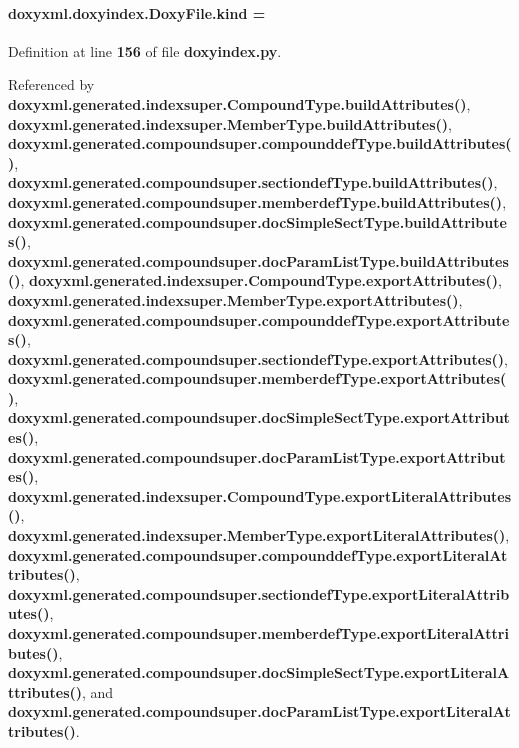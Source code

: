 \paragraph[{kind}]{ doxyxml.\+doxyindex.\+Doxy\+File.\+kind = \textquotesingle{}\hspace{0.3cm}{\ttfamily [static]}}\label{classdoxyxml_1_1doxyindex_1_1DoxyFile_a4be3dce59cc4b8322dfa2df5cbd0ef0d}


Definition at line {\bf 156} of file {\bf doxyindex.\+py}.



Referenced by {\bf doxyxml.\+generated.\+indexsuper.\+Compound\+Type.\+build\+Attributes()}, {\bf doxyxml.\+generated.\+indexsuper.\+Member\+Type.\+build\+Attributes()}, {\bf doxyxml.\+generated.\+compoundsuper.\+compounddef\+Type.\+build\+Attributes()}, {\bf doxyxml.\+generated.\+compoundsuper.\+sectiondef\+Type.\+build\+Attributes()}, {\bf doxyxml.\+generated.\+compoundsuper.\+memberdef\+Type.\+build\+Attributes()}, {\bf doxyxml.\+generated.\+compoundsuper.\+doc\+Simple\+Sect\+Type.\+build\+Attributes()}, {\bf doxyxml.\+generated.\+compoundsuper.\+doc\+Param\+List\+Type.\+build\+Attributes()}, {\bf doxyxml.\+generated.\+indexsuper.\+Compound\+Type.\+export\+Attributes()}, {\bf doxyxml.\+generated.\+indexsuper.\+Member\+Type.\+export\+Attributes()}, {\bf doxyxml.\+generated.\+compoundsuper.\+compounddef\+Type.\+export\+Attributes()}, {\bf doxyxml.\+generated.\+compoundsuper.\+sectiondef\+Type.\+export\+Attributes()}, {\bf doxyxml.\+generated.\+compoundsuper.\+memberdef\+Type.\+export\+Attributes()}, {\bf doxyxml.\+generated.\+compoundsuper.\+doc\+Simple\+Sect\+Type.\+export\+Attributes()}, {\bf doxyxml.\+generated.\+compoundsuper.\+doc\+Param\+List\+Type.\+export\+Attributes()}, {\bf doxyxml.\+generated.\+indexsuper.\+Compound\+Type.\+export\+Literal\+Attributes()}, {\bf doxyxml.\+generated.\+indexsuper.\+Member\+Type.\+export\+Literal\+Attributes()}, {\bf doxyxml.\+generated.\+compoundsuper.\+compounddef\+Type.\+export\+Literal\+Attributes()}, {\bf doxyxml.\+generated.\+compoundsuper.\+sectiondef\+Type.\+export\+Literal\+Attributes()}, {\bf doxyxml.\+generated.\+compoundsuper.\+memberdef\+Type.\+export\+Literal\+Attributes()}, {\bf doxyxml.\+generated.\+compoundsuper.\+doc\+Simple\+Sect\+Type.\+export\+Literal\+Attributes()}, and {\bf doxyxml.\+generated.\+compoundsuper.\+doc\+Param\+List\+Type.\+export\+Literal\+Attributes()}.



